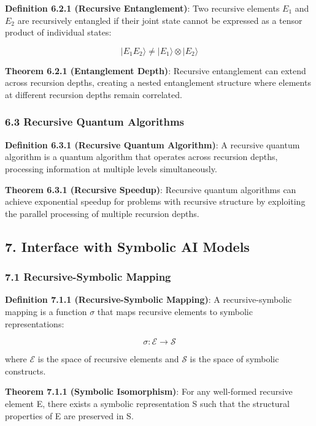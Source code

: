 \documentclass[
]{article}
\begin{document}
\textbf{Definition 6.2.1 (Recursive Entanglement)}: Two recursive
elements \(E_1\) and \(E_2\) are recursively entangled if their joint
state cannot be expressed as a tensor product of individual states:

\[|E_1 E_2\rangle \neq |E_1\rangle \otimes |E_2\rangle\]

\textbf{Theorem 6.2.1 (Entanglement Depth)}: Recursive entanglement can
extend across recursion depths, creating a nested entanglement structure
where elements at different recursion depths remain correlated.

\subsubsection{6.3 Recursive Quantum
Algorithms}\label{recursive-quantum-algorithms}

\textbf{Definition 6.3.1 (Recursive Quantum Algorithm)}: A recursive
quantum algorithm is a quantum algorithm that operates across recursion
depths, processing information at multiple levels simultaneously.

\textbf{Theorem 6.3.1 (Recursive Speedup)}: Recursive quantum algorithms
can achieve exponential speedup for problems with recursive structure by
exploiting the parallel processing of multiple recursion depths.

\subsection{7. Interface with Symbolic AI
Models}\label{interface-with-symbolic-ai-models}

\subsubsection{7.1 Recursive-Symbolic
Mapping}\label{recursive-symbolic-mapping}

\textbf{Definition 7.1.1 (Recursive-Symbolic Mapping)}: A
recursive-symbolic mapping is a function \(\sigma\) that maps recursive
elements to symbolic representations:

\[\sigma: \mathcal{E} \rightarrow \mathcal{S}\]

where \(\mathcal{E}\) is the space of recursive elements and
\(\mathcal{S}\) is the space of symbolic constructs.

\textbf{Theorem 7.1.1 (Symbolic Isomorphism)}: For any well-formed
recursive element E, there exists a symbolic representation S such that
the structural properties of E are preserved in S.
\end{document}
